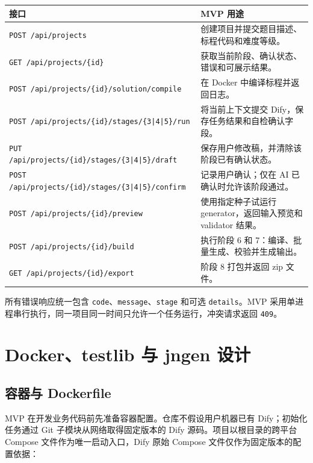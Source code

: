 \documentclass[UTF8,zihao=-4]{ctexart}
\begin{document}
\begin{longtable}{p{5.8cm}p{8.1cm}}
\toprule
接口 & MVP 用途 \\
\midrule
\texttt{POST /api/projects} & 创建项目并提交题目描述、标程代码和难度等级。 \\
\texttt{GET /api/projects/\{id\}} & 获取当前阶段、确认状态、错误和可展示结果。 \\
\texttt{POST /api/projects/\{id\}/}\newline\texttt{solution/compile} & 在 Docker 中编译标程并返回日志。 \\
\texttt{POST /api/projects/\{id\}/}\newline\texttt{stages/\{3|4|5\}/run} & 将当前上下文提交 Dify，保存任务结果和自检确认字段。 \\
\texttt{PUT /api/projects/\{id\}/}\newline\texttt{stages/\{3|4|5\}/draft} & 保存用户修改稿，并清除该阶段已有确认状态。 \\
\texttt{POST /api/projects/\{id\}/}\newline\texttt{stages/\{3|4|5\}/confirm} & 记录用户确认；仅在 AI 已确认时允许该阶段通过。 \\
\texttt{POST /api/projects/\{id\}/preview} & 使用指定种子试运行 generator，返回输入预览和 validator 结果。 \\
\texttt{POST /api/projects/\{id\}/build} & 执行阶段 6 和 7：编译、批量生成、校验并生成输出。 \\
\texttt{GET /api/projects/\{id\}/export} & 阶段 8 打包并返回 zip 文件。 \\
\bottomrule
\end{longtable}

所有错误响应统一包含 \texttt{code}、\texttt{message}、\texttt{stage} 和可选 \texttt{details}。MVP 采用单进程串行执行，同一项目同一时间只允许一个任务运行，冲突请求返回 \texttt{409}。

\section{Docker、testlib 与 jngen 设计}

\subsection{容器与 Dockerfile}

MVP 在开发业务代码前先准备容器配置。仓库不假设用户机器已有 Dify；初始化任务通过 Git 子模块从网络取得固定版本的 Dify 源码。项目以根目录的跨平台 Compose 文件作为唯一启动入口，Dify 原始 Compose 文件仅作为固定版本的配置依据：
\end{document}
